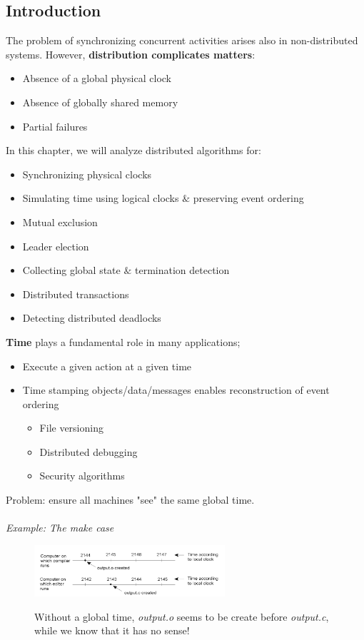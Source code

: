 \documentclass[10pt,a4paper]{article}
\begin{document}
\subsection{Introduction}
The problem of synchronizing concurrent activities arises also in non-distributed systems. However, \textbf{distribution complicates matters}:
\begin{itemize}
	\item Absence of a global physical clock
	\item Absence of globally shared memory
	\item Partial failures
\end{itemize}
In this chapter, we will analyze distributed algorithms for:
\begin{itemize}
	\item Synchronizing physical clocks
 	\item Simulating time using logical clocks $\&$ preserving event ordering
	\item Mutual exclusion
	\item Leader election
	\item Collecting global state $\&$ termination detection
	\item Distributed transactions
	\item Detecting distributed deadlocks
\end{itemize}
\textbf{Time} plays a fundamental role in many applications;
\begin{itemize}
	\item Execute a given action at a given time
	\item Time stamping objects/data/messages enables reconstruction of event ordering
	\begin{itemize}
		\item File versioning
		\item Distributed debugging
		\item Security algorithms
	\end{itemize}
\end{itemize}
Problem: ensure all machines "see" the same global time. \\ \\
\textit{Example: The make case}
\begin{figure}[h!]
 \hfill \includegraphics[width=200pt]{images/make.png}\hspace*{\fill}
  \label{fig:make}
  \caption{Without a global time, \textit{output.o} seems to be create before \textit{output.c}, while we know that it has no sense! }
\end{figure}
\end{document}
